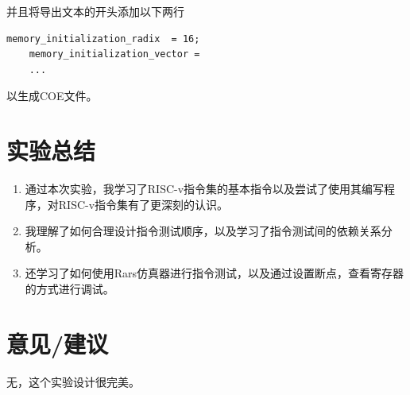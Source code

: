 \documentclass[a4paper]{article}
\begin{document}
并且将导出文本的开头添加以下两行
\begin{lstlisting}[language={[RISC-V]Assembler},title={srt.asm}]
    memory_initialization_radix  = 16;
    memory_initialization_vector =
    ...
\end{lstlisting}

以生成COE文件。

\section {实验总结}
\begin{enumerate}
  \item 通过本次实验，我学习了RISC-v指令集的基本指令以及尝试了使用其编写程序，对RISC-v指令集有了更深刻的认识。
  \item 我理解了如何合理设计指令测试顺序，以及学习了指令测试间的依赖关系分析。
  \item 还学习了如何使用Rars仿真器进行指令测试，以及通过设置断点，查看寄存器的方式进行调试。
\end{enumerate}
\section {意见/建议}
无，这个实验设计很完美。
\end{document}
